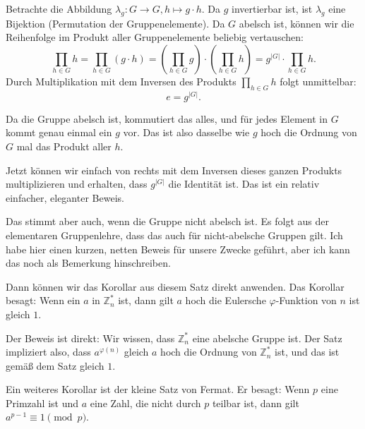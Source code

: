 \begin{math-stroke}

\begin{short-proof}
Betrachte die Abbildung $\lambda_g \colon G \to G, h \mapsto g \cdot h$. Da $g$ invertierbar ist, ist $\lambda_g$ eine Bijektion (Permutation der Gruppenelemente). Da $G$ abelsch ist, können wir die Reihenfolge im Produkt aller Gruppenelemente beliebig vertauschen:
\[
\prod_{h \in G} h = \prod_{h \in G} (g \cdot h) = \left( \prod_{h \in G} g \right) \cdot \left( \prod_{h \in G} h \right) = g^{|G|} \cdot \prod_{h \in G} h.
\]
Durch Multiplikation mit dem Inversen des Produkts $\prod_{h \in G} h$ folgt unmittelbar:
\[
e = g^{|G|}.
\]
\end{short-proof}
\end{math-stroke}

\begin{spoken-clean}[00:47:11 - 00:49:37]
Da die Gruppe abelsch ist, kommutiert das alles, und für jedes Element in $G$ kommt genau einmal ein $g$ vor. Das ist also dasselbe wie $g$ hoch die Ordnung von $G$ mal das Produkt aller $h$.

Jetzt können wir einfach von rechts mit dem Inversen dieses ganzen Produkts multiplizieren und erhalten, dass $g^{|G|}$ die Identität ist. Das ist ein relativ einfacher, eleganter Beweis.

Das stimmt aber auch, wenn die Gruppe nicht abelsch ist. Es folgt aus der elementaren Gruppenlehre, dass das auch für nicht-abelsche Gruppen gilt. Ich habe hier einen kurzen, netten Beweis für unsere Zwecke geführt, aber ich kann das noch als Bemerkung hinschreiben.
\end{spoken-clean}

\begin{math-stroke}
\end{math-stroke}

\begin{spoken-clean}[00:49:37 - 00:51:05]
Dann können wir das Korollar aus diesem Satz direkt anwenden. Das Korollar besagt: Wenn ein $a$ in $\mathbb{Z}_n^*$ ist, dann gilt $a$ hoch die Eulersche $\varphi$-Funktion von $n$ ist gleich $1$.

Der Beweis ist direkt: Wir wissen, dass $\mathbb{Z}_n^*$ eine abelsche Gruppe ist. Der Satz impliziert also, dass $a^{\varphi(n)}$ gleich $a$ hoch die Ordnung von $\mathbb{Z}_n^*$ ist, und das ist gemäß dem Satz gleich $1$.

Ein weiteres Korollar ist der kleine Satz von Fermat. Er besagt: Wenn $p$ eine Primzahl ist und $a$ eine Zahl, die nicht durch $p$ teilbar ist, dann gilt $a^{p-1} \equiv 1 \pmod p$.
\end{spoken-clean}

